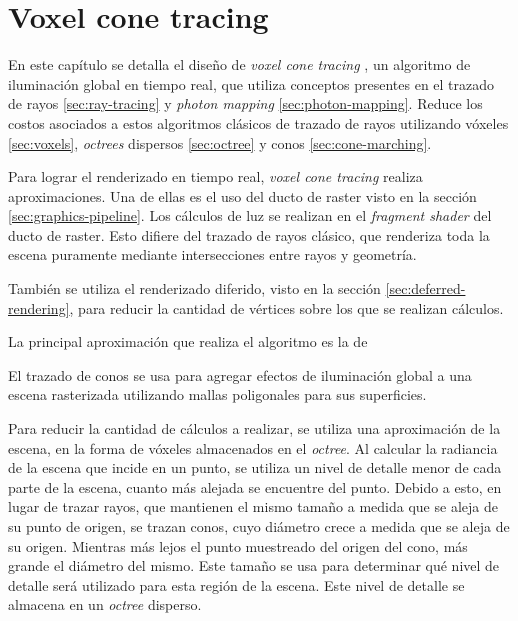\graphicspath{{chapters/3_diseño/figures/}}

\chapter{Voxel cone tracing}\label{chap:design}

En este capítulo se detalla el diseño de \textit{voxel cone tracing} \cite{voxel-cone-tracing}, un algoritmo de iluminación global en tiempo real, que utiliza conceptos presentes en el trazado de rayos \ref{sec:ray-tracing} y \textit{photon mapping} \ref{sec:photon-mapping}.
Reduce los costos asociados a estos algoritmos clásicos de trazado de rayos utilizando vóxeles \ref{sec:voxels}, \textit{octrees} dispersos \ref{sec:octree} y conos \ref{sec:cone-marching}.


Para lograr el renderizado en tiempo real, \textit{voxel cone tracing} realiza aproximaciones.
Una de ellas es el uso del ducto de raster visto en la sección \ref{sec:graphics-pipeline}.
Los cálculos de luz se realizan en el \textit{fragment shader} del ducto de raster.
Esto difiere del trazado de rayos clásico, que renderiza toda la escena puramente mediante intersecciones entre rayos y geometría.

También se utiliza el renderizado diferido, visto en la sección \ref{sec:deferred-rendering}, para reducir la cantidad de vértices sobre los que se realizan cálculos.

La principal aproximación que realiza el algoritmo es la de 



El trazado de conos se usa para agregar efectos de iluminación global a una escena rasterizada utilizando mallas poligonales para sus superficies.

Para reducir la cantidad de cálculos a realizar, se utiliza una aproximación de la escena, en la forma de vóxeles almacenados en el \textit{octree}.
Al calcular la radiancia de la escena que incide en un punto, se utiliza un nivel de detalle menor de cada parte de la escena, cuanto más alejada se encuentre del punto.
Debido a esto, en lugar de trazar rayos, que mantienen el mismo tamaño a medida que se aleja de su punto de origen, se trazan conos, cuyo diámetro crece a medida que se aleja de su origen.
Mientras más lejos el punto muestreado del origen del cono, más grande el diámetro del mismo.
Este tamaño se usa para determinar qué nivel de detalle será utilizado para esta región de la escena.
Este nivel de detalle se almacena en un \textit{octree} disperso.


